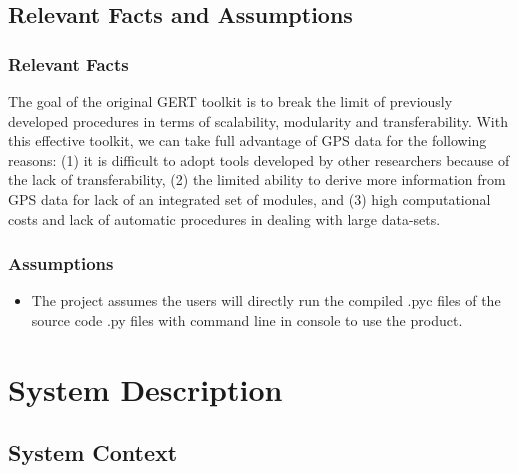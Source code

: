 \documentclass[12pt, titlepage]{article}
\begin{document}
\subsection{Relevant Facts and Assumptions}

\subsubsection{Relevant Facts}
The goal of the original GERT toolkit is to break the limit of previously developed procedures in terms of scalability, modularity and transferability. With this effective toolkit, we can take full advantage of GPS data for the following reasons: (1) it is difficult to adopt tools developed by other researchers because of the lack of transferability, (2) the limited ability to derive more information from GPS data for lack of an integrated set of modules, and (3) high computational costs and lack of automatic procedures in dealing with large data-sets. 

\subsubsection{Assumptions}
\begin{itemize}
    \item The project assumes the users will directly run the compiled .pyc files of the source code .py files with command line in console to use the product.
\end{itemize}

\section{System Description}

\subsection{System Context}
\end{document}
